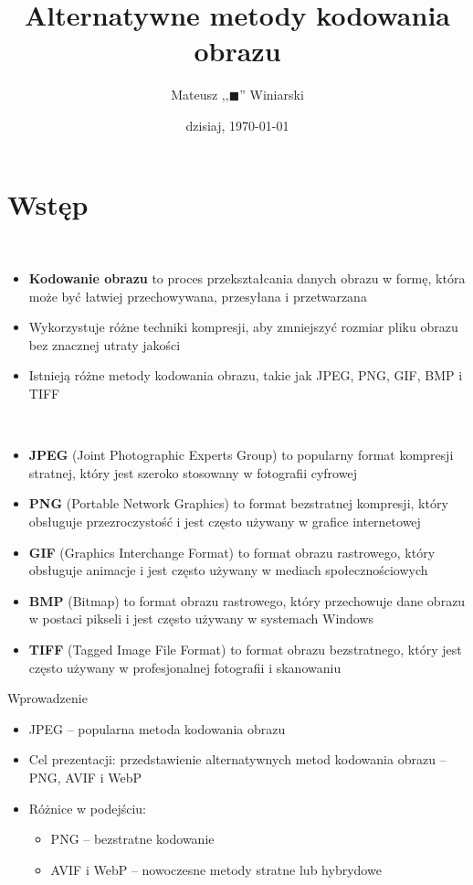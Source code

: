 \documentclass[aspectratio=1610]{beamer}
\title{Alternatywne metody kodowania obrazu}
\author[M. Winiarski]{Mateusz ,,\(\blacksquare\)'' Winiarski}
\institute[Biometria]{biofizyka\(^\dagger\), FAIS, Uniwersytet Jagielloński}
\date[dzisiaj]{dzisiaj, \today}
\begin{document}
\frame{\titlepage}

\section{Wstęp}

\begin{frame}{~}{}
  \transfade
  \begin{itemize}
    \item \textbf{Kodowanie obrazu} to proces przekształcania danych obrazu w formę, która może być łatwiej przechowywana, przesyłana i przetwarzana
    \item Wykorzystuje różne techniki kompresji, aby zmniejszyć rozmiar pliku obrazu bez znacznej utraty jakości
    \item Istnieją różne metody kodowania obrazu, takie jak JPEG, PNG, GIF, BMP i TIFF
  \end{itemize}

\end{frame}
\begin{frame}{~}{}
  \transfade
  \begin{itemize}
    \item \textbf{JPEG} (Joint Photographic Experts Group) to popularny format kompresji stratnej, który jest szeroko stosowany w fotografii cyfrowej
    \item \textbf{PNG} (Portable Network Graphics) to format bezstratnej kompresji, który obsługuje przezroczystość i jest często używany w grafice internetowej
    \item \textbf{GIF} (Graphics Interchange Format) to format obrazu rastrowego, który obsługuje animacje i jest często używany w mediach społecznościowych
    \item \textbf{BMP} (Bitmap) to format obrazu rastrowego, który przechowuje dane obrazu w postaci pikseli i jest często używany w systemach Windows
    \item \textbf{TIFF} (Tagged Image File Format) to format obrazu bezstratnego, który jest często używany w profesjonalnej fotografii i skanowaniu
  \end{itemize}

  \end{frame}

\begin{frame}{Wprowadzenie}
    \begin{itemize}
        \item JPEG – popularna metoda kodowania obrazu
        \item Cel prezentacji: przedstawienie alternatywnych metod kodowania obrazu – PNG, AVIF i WebP
        \item Różnice w podejściu:
        \begin{itemize}
            \item PNG – bezstratne kodowanie
            \item AVIF i WebP – nowoczesne metody stratne lub hybrydowe
        \end{itemize}
    \end{itemize}
\end{frame}
\end{document}

